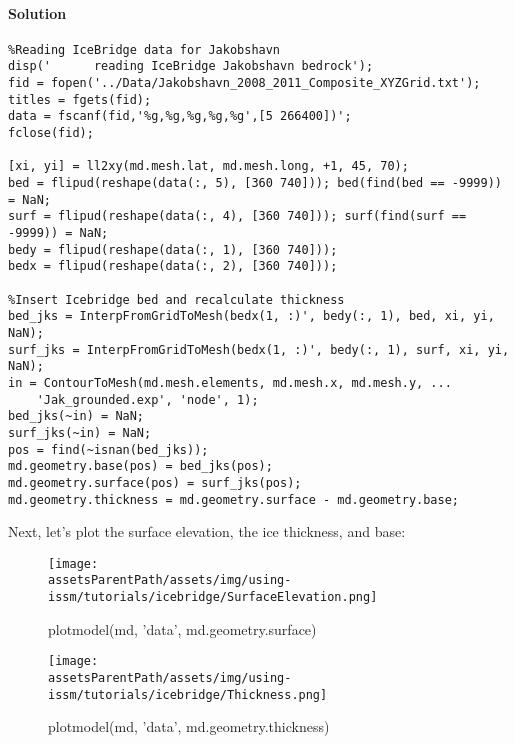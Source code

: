 \paragraph{Solution}
\begin{lstlisting}
%Reading IceBridge data for Jakobshavn
disp('      reading IceBridge Jakobshavn bedrock');
fid = fopen('../Data/Jakobshavn_2008_2011_Composite_XYZGrid.txt');
titles = fgets(fid); 
data = fscanf(fid,'%g,%g,%g,%g,%g',[5 266400])';
fclose(fid);

[xi, yi] = ll2xy(md.mesh.lat, md.mesh.long, +1, 45, 70);
bed = flipud(reshape(data(:, 5), [360 740])); bed(find(bed == -9999)) = NaN;
surf = flipud(reshape(data(:, 4), [360 740])); surf(find(surf == -9999)) = NaN;
bedy = flipud(reshape(data(:, 1), [360 740]));
bedx = flipud(reshape(data(:, 2), [360 740]));

%Insert Icebridge bed and recalculate thickness
bed_jks = InterpFromGridToMesh(bedx(1, :)', bedy(:, 1), bed, xi, yi, NaN);
surf_jks = InterpFromGridToMesh(bedx(1, :)', bedy(:, 1), surf, xi, yi, NaN);
in = ContourToMesh(md.mesh.elements, md.mesh.x, md.mesh.y, ...
	'Jak_grounded.exp', 'node', 1);
bed_jks(~in) = NaN;
surf_jks(~in) = NaN;
pos = find(~isnan(bed_jks));
md.geometry.base(pos) = bed_jks(pos);
md.geometry.surface(pos) = surf_jks(pos);
md.geometry.thickness = md.geometry.surface - md.geometry.base;
\end{lstlisting}

Next, let's plot the surface elevation, the ice thickness, and base:
\begin{figure}[H]
	\begin{center}
	\texttt{[image: \\assetsParentPath/assets/img/using-issm/tutorials/icebridge/SurfaceElevation.png]}
	\caption{plotmodel(md, 'data', md.geometry.surface)}
	\end{center}
\end{figure}

\begin{figure}[H]
	\begin{center}
	\texttt{[image: \\assetsParentPath/assets/img/using-issm/tutorials/icebridge/Thickness.png]}
	\caption{plotmodel(md, 'data', md.geometry.thickness)}
	\end{center}
\end{figure}

